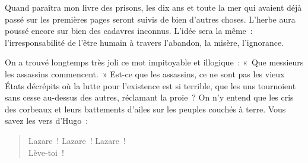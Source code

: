 \documentclass[french,twoside]{book} %
\begin{document}
Quand paraîtra mon livre des prisons, les dix ans et toute la mer qui avaient déjà passé sur les premières pages seront suivis de bien d’autres choses. L’herbe aura poussé encore sur bien des cadavres inconnus. L’idée sera la même : l’irresponsabilité de l’être humain à travers l’abandon, la misère, l’ignorance.\par
On a trouvé longtemps très joli ce mot impitoyable et illogique : « Que messieurs les assassins commencent. » Est-ce que les assassins, ce ne sont pas les vieux États décrépits où la lutte pour l’existence est si terrible, que les uns tournoient sans cesse au-dessus des autres, réclamant la proie ? On n’y entend que les cris des corbeaux et leurs battements d’ailes sur les peuples couchés à terre. Vous savez les vers d’Hugo :\par


\begin{verse}
Lazare ! Lazare ! Lazare !\\
Lève-toi !\\
\end{verse}
\end{document}
